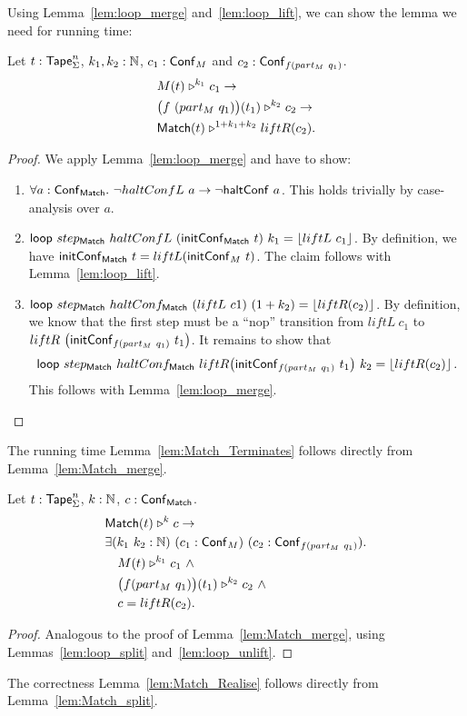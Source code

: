 Using Lemma~\ref{lem:loop_merge} and~\ref{lem:loop_lift}, we can show the lemma we need for running time:
\begin{lemma}
  \label{lem:Match_merge}
  Let $t : \mathsf{Tape}_\Sigma^n$, $k_1, k_2:\mathbb{N}$, $c_1 : \mathsf{Conf}_M$ and $c_2 : \mathsf{Conf}_{f(part_M~q_1)}$.
  \begin{alignat*}{1}
    & M(t) \mathrel{\triangleright}^{k_1} c_1 \rightarrow\\
    & \bigl( f~(part_M~q_1) \bigr) (t_1) \mathrel{\triangleright}^{k_2} c_2 \rightarrow\\
    & \mathsf{Match}(t) \mathrel{\triangleright}^{1+k_1+k_2} liftR(c_2).
  \end{alignat*}
\end{lemma}
\begin{proof}
  We apply Lemma~\ref{lem:loop_merge} and have to show:
  \begin{enumerate}
  \item $\forall a:\mathsf{Conf}_{\mathsf{Match}}.~ \lnot haltConfL~a \rightarrow \lnot \mathsf{haltConf}~a$.  This holds trivially by case-analysis over $a$.
  \item $\mathsf{loop}~step_{\mathsf{Match}}~haltConfL~(\mathsf{initConf}_{\mathsf{Match}}~t)~k_1 =
    \left\lfloor {liftL~c_1} \right\rfloor$.  By definition, we have $\mathsf{initConf}_{\mathsf{Match}}~t=liftL(\mathsf{initConf}_M~t)$.  The claim follows with Lemma~\ref{lem:loop_lift}.
  \item $\mathsf{loop}~step_{\mathsf{Match}}~haltConf_{\mathsf{Match}}~(liftL~c1)~(1+k_2) =
    \left\lfloor {liftR(c_2)} \right\rfloor$.  By definition, we know that the first step must be a ``nop'' transition from
    $liftL~c_1$ to\\
    $liftR~\bigl(\mathsf{initConf}_{f(part_M~q_1)}~t_1 \bigr)$.  It remains to show that
    $$\mathsf{loop}~step_{\mathsf{Match}}~haltConf_{\mathsf{Match}}~liftR \bigl(\mathsf{initConf}_{f(part_M~q_1)}~t_1 \bigr)~k_2 = \left\lfloor {liftR(c_2)} \right\rfloor.$$
    This follows with Lemma~\ref{lem:loop_merge}.
  \end{enumerate}
\end{proof}
The running time Lemma~\ref{lem:Match_Terminates} follows directly from Lemma~\ref{lem:Match_merge}.

\begin{lemma}
  \label{lem:Match_split}
  Let $t : \mathsf{Tape}_\Sigma^n$, $k : \mathbb{N}$, $c : \mathsf{Conf}_{\mathsf{Match}}$.
  \begin{align*}
    & \mathsf{Match}(t) \mathrel{\triangleright}^k c \rightarrow \\
    & \exists (k_1~k_2 : \mathbb{N})~(c_1 : \mathsf{Conf}_M)~(c_2 : \mathsf{Conf}_{f(part_M~q_1)}). \\
    & \quad M(t) \mathrel{\triangleright}^{k_1} c_1 ~\land~ \\
    & \quad \bigl( f (part_M~q_1) \bigr) (t_1) \mathrel{\triangleright}^{k_2} c_2 ~\land~ \\
    & \quad c = liftR(c_2).
  \end{align*}
\end{lemma}
\begin{proof}
  Analogous to the proof of Lemma~\ref{lem:Match_merge}, using Lemmas~\ref{lem:loop_split} and~\ref{lem:loop_unlift}.
\end{proof}
The correctness Lemma~\ref{lem:Match_Realise} follows directly from Lemma~\ref{lem:Match_split}.


